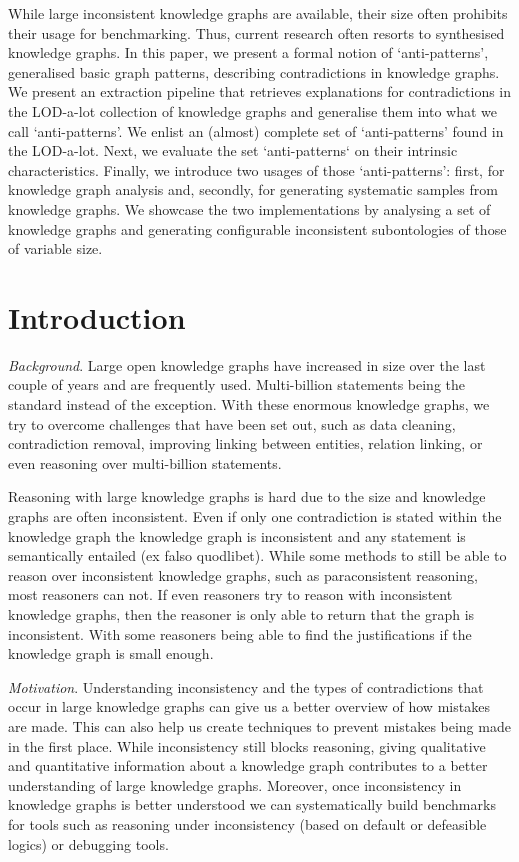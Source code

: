 \documentclass{article}
\begin{document}
While large inconsistent knowledge graphs are available, their size often prohibits their usage for benchmarking. Thus, current research often resorts to synthesised knowledge graphs. In this paper, we present a formal notion of `anti-patterns', generalised basic graph patterns, describing contradictions in knowledge graphs. We present an extraction pipeline that retrieves explanations for contradictions in the LOD-a-lot collection of knowledge graphs and generalise them into what we call `anti-patterns'. We enlist an (almost) complete set of `anti-patterns' found in the LOD-a-lot. Next, we evaluate the set `anti-patterns` on their intrinsic characteristics. Finally, we introduce two usages of those `anti-patterns': first, for knowledge graph analysis and, secondly, for generating systematic samples from knowledge graphs. We showcase the two implementations by analysing a set of knowledge graphs and generating configurable inconsistent subontologies of those of variable size.  

\newpage
\tableofcontents
\newpage
{}

\section{Introduction}
\textit{Background}. Large open knowledge graphs have increased in size over the last couple of years and are frequently used. Multi-billion statements being the standard instead of the exception. With these enormous knowledge graphs, we try to overcome challenges that have been set out, such as data cleaning, contradiction removal, improving linking between entities, relation linking, or even reasoning over multi-billion statements.

Reasoning with large knowledge graphs is hard due to the size and knowledge graphs are often inconsistent. Even if only one contradiction is stated within the knowledge graph the knowledge graph is inconsistent and any statement is semantically entailed (ex falso quodlibet). While some methods to still be able to reason over inconsistent knowledge graphs, such as paraconsistent reasoning\cite{Kaminski:2015}, most reasoners can not. If even reasoners try to reason with inconsistent knowledge graphs, then the reasoner is only able to return that the graph is inconsistent. With some reasoners being able to find the justifications if the knowledge graph is small enough. 

\textit{Motivation}. Understanding inconsistency and the types of contradictions that occur in large knowledge graphs can give us a better overview of how mistakes are made. This can also help us create techniques to prevent mistakes being made in the first place. While inconsistency still blocks reasoning, giving qualitative and quantitative information about a knowledge graph contributes to a better understanding of large knowledge graphs. Moreover, once inconsistency in knowledge graphs is better understood we can systematically build benchmarks for tools such as reasoning under inconsistency (based on default or defeasible logics) or debugging tools. 
\end{document}

